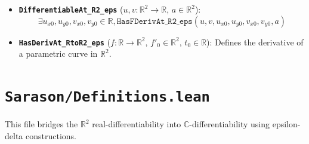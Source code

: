 \documentclass[11pt]{article}
\begin{document}
\begin{itemize}
    \item \textbf{\texttt{DifferentiableAt\_R2\_eps}} ($u, v : \mathbb{R}^2 \to \mathbb{R}$, $a \in \mathbb{R}^2$):
    \[ \exists u_{x0}, u_{y0}, v_{x0}, v_{y0} \in \mathbb{R}, \texttt{HasFDerivAt\_R2\_eps}(u, v, u_{x0}, u_{y0}, v_{x0}, v_{y0}, a) \]
    
    \item \textbf{\texttt{HasDerivAt\_RtoR2\_eps}} ($f : \mathbb{R} \to \mathbb{R}^2$, $f'_0 \in \mathbb{R}^2$, $t_0 \in \mathbb{R}$): Defines the derivative of a parametric curve in $\mathbb{R}^2$.
\end{itemize}

\section{\texttt{Sarason/Definitions.lean}}

This file bridges the $\mathbb{R}^2$ real-differentiability into $\mathbb{C}$-differentiability using epsilon-delta constructions.
\end{document}
